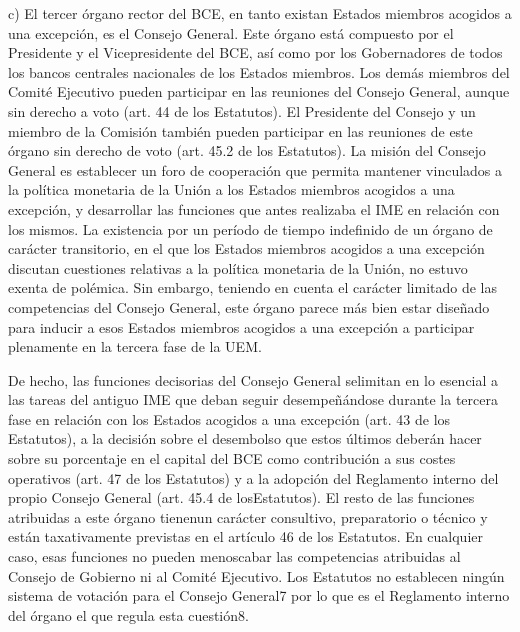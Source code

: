 \documentclass[10pt,a4paper]{article}
\begin{document}
c) El tercer órgano rector del BCE, en tanto existan Estados miembros acogidos a una excepción, es el Consejo General. Este órgano está compuesto por el Presidente y el Vicepresidente del BCE, así como por los Gobernadores de todos los bancos centrales nacionales de los Estados miembros. Los demás miembros del Comité Ejecutivo pueden participar en las reuniones del Consejo General, aunque sin derecho a voto (art. 44 de los Estatutos). El Presidente del Consejo y un miembro de la Comisión también pueden participar en las reuniones de este órgano sin derecho de voto (art. 45.2 de los Estatutos). La misión del Consejo General es establecer un foro de cooperación que permita mantener vinculados a la política monetaria de la Unión a los Estados miembros acogidos a una excepción, y desarrollar las funciones que antes realizaba el IME en relación con los mismos. La existencia por un período de tiempo indefinido de un órgano de carácter transitorio, en el que los Estados miembros acogidos a una excepción discutan cuestiones relativas a la política monetaria de la Unión, no estuvo exenta de polémica. Sin embargo, teniendo en cuenta el carácter limitado de las competencias del Consejo General, este órgano parece más bien estar diseñado para inducir a esos Estados miembros acogidos a una excepción a participar plenamente en la tercera fase de la UEM.

De hecho, las funciones decisorias del Consejo General selimitan en lo esencial a las tareas del antiguo IME que deban seguir desempeñándose durante la tercera fase en relación con los Estados acogidos a una excepción (art. 43 de los Estatutos), a la decisión sobre el desembolso que estos últimos deberán hacer sobre su porcentaje en el capital del BCE como contribución a sus costes operativos (art. 47 de los Estatutos) y a la adopción del Reglamento interno del propio Consejo General (art. 45.4 de losEstatutos). El resto de las funciones atribuidas a este órgano tienenun carácter consultivo, preparatorio o técnico y están taxativamente previstas en el artículo 46 de los Estatutos. En cualquier caso, esas funciones no pueden menoscabar las competencias atribuidas al Consejo de Gobierno ni al Comité Ejecutivo. Los Estatutos no establecen ningún sistema de votación para el Consejo General7 por lo que es el Reglamento interno del órgano el que regula esta cuestión8.
\end{document}
